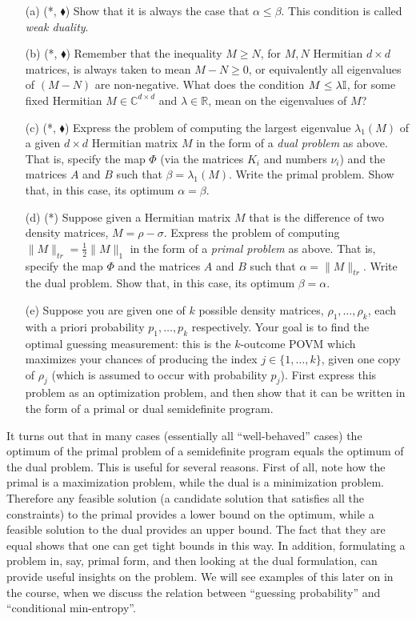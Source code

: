 \documentclass[12pt]{article}
\begin{document}
\begin{enumerate}
\begin{center}
\begin{minipage}{2.5in}
 \end{minipage}
\end{center}
\begin{enumerate}
\item[(a)](*, $\blacklozenge$) Show that it is always the case that $\alpha \leq \beta$. This condition is called \emph{weak duality}.
\item[(b)](*, $\blacklozenge$) Remember that the inequality $M\geq N$, for $M,N$ Hermitian $d\times d$ matrices, is always taken to mean $M-N\geq 0$, or equivalently all eigenvalues of $(M-N)$ are non-negative. What does the condition $M \leq \lambda \mathbb{I}$, for some fixed Hermitian $M\in \mathbb{C}^{d \times d}$ and $\lambda\in \mathbb{R}$, mean on the eigenvalues of $M$? 
\item[(c)](*, $\blacklozenge$) Express the problem of computing the largest eigenvalue $\lambda_1(M)$ of a given $d\times d$ Hermitian matrix $M$ in the form of a \emph{dual problem} as above. That is, specify the map $\Phi$ (via the matrices $K_i$ and numbers $\nu_i$) and the matrices $A$ and $B$ such that $\beta = \lambda_1(M)$. Write the primal problem. Show that, in this case, its optimum $\alpha = \beta$. 
\item[(d)](*) Suppose given a Hermitian matrix $M$ that is the difference of two density matrices, $M=\rho-\sigma$. Express the problem of computing $\|M\|_{tr} = \frac{1}{2}\|M\|_1$ in the form of a \emph{primal problem} as above. That is, specify the map $\Phi$ and the matrices $A$ and $B$ such that $\alpha = \|M\|_{tr}$. Write the dual problem. Show that, in this case, its optimum $\beta = \alpha$. 
\item[(e)] Suppose you are given one of $k$ possible density matrices, $\rho_1,\ldots,\rho_k$, each with a priori probability $p_1,\ldots,p_k$ respectively. Your goal is to find the optimal guessing measurement: this is the $k$-outcome POVM which maximizes your chances of producing the index $j\in\{1,\ldots,k\}$, given one copy of $\rho_j$ (which is assumed to occur with probability $p_j$). First express this problem as an optimization problem, and then show that it can be written in the form of a primal or dual semidefinite program.
\end{enumerate}
It turns out that in many cases (essentially all ``well-behaved'' cases) the optimum of the primal problem of a semidefinite program equals the optimum of the dual problem. This is useful for several reasons. First of all, note how the primal is a maximization problem, while the dual is a minimization problem. Therefore any feasible solution (a candidate solution that satisfies all the constraints) to the primal provides a lower bound on the optimum, while a feasible solution to the dual provides an upper bound. The fact that they are equal shows that one can get tight bounds in this way. In addition, formulating a problem in, say, primal form, and then looking at the dual formulation, can provide useful insights on the problem. We will see examples of this later on in the course, when we discuss the relation between ``guessing probability'' and ``conditional min-entropy''. 

\end{enumerate}
\end{document}
